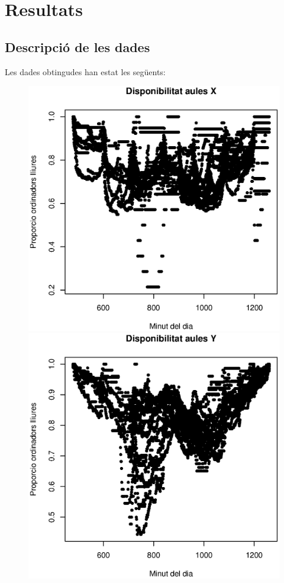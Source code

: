 \section{Resultats}
\captionsetup[figure]{labelsep=space}
\subsection{Descripció de les dades}

Les dades obtingudes han estat les següents:

\begin{figure}[h!]
\centering
\begin{minipage}{0.45\linewidth}
\includegraphics[width=1\linewidth]{./images/dades_X.eps}
\end{minipage}
\hfill
\begin{minipage}{0.45\linewidth}
\includegraphics[width=1\linewidth]{./images/dades_Y.eps}

\end{minipage}
\end{figure}
